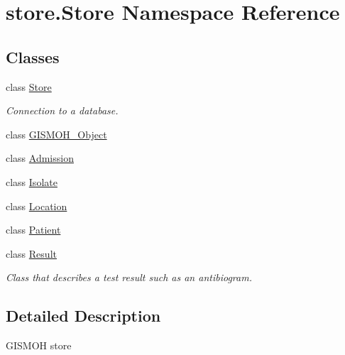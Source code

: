 \hypertarget{namespacestore_1_1_store}{\section{store.\-Store Namespace Reference}
\label{namespacestore_1_1_store}
}
\subsection*{Classes}
\begin{DoxyCompactItemize}
\item 
class \hyperlink{classstore_1_1_store_1_1_store}{Store}
\begin{DoxyCompactList}\small\item\em Connection to a database. \end{DoxyCompactList}\item 
class \hyperlink{classstore_1_1_store_1_1_g_i_s_m_o_h___object}{G\-I\-S\-M\-O\-H\-\_\-\-Object}
\item 
class \hyperlink{classstore_1_1_store_1_1_admission}{Admission}
\item 
class \hyperlink{classstore_1_1_store_1_1_isolate}{Isolate}
\item 
class \hyperlink{classstore_1_1_store_1_1_location}{Location}
\item 
class \hyperlink{classstore_1_1_store_1_1_patient}{Patient}
\item 
class \hyperlink{classstore_1_1_store_1_1_result}{Result}
\begin{DoxyCompactList}\small\item\em Class that describes a test result such as an antibiogram. \end{DoxyCompactList}\end{DoxyCompactItemize}


\subsection{Detailed Description}
\begin{DoxyVerb}GISMOH store
\end{DoxyVerb}
 